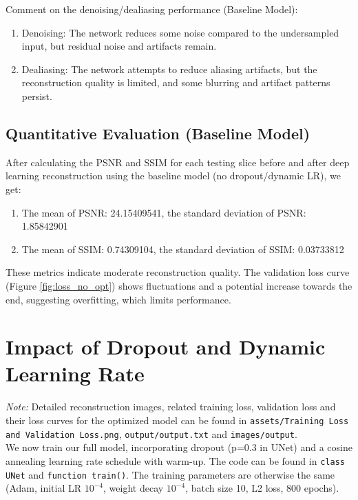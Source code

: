 \documentclass{article}
\begin{document}
Comment on the denoising/dealiasing performance (Baseline Model):
\begin{enumerate}
  \item Denoising: The network reduces some noise compared to the undersampled input, but residual noise and artifacts remain.
  \item Dealiasing: The network attempts to reduce aliasing artifacts, but the reconstruction quality is limited, and some blurring and artifact patterns persist.
\end{enumerate}

\subsection{Quantitative Evaluation (Baseline Model)}
After calculating the PSNR and SSIM for each testing slice before and after deep learning reconstruction using the baseline model (no dropout/dynamic LR), we get:
\begin{enumerate}
  \item The mean of PSNR: 24.15409541, the standard deviation of PSNR: 1.85842901
  \item The mean of SSIM: 0.74309104, the standard deviation of SSIM: 0.03733812
\end{enumerate}
These metrics indicate moderate reconstruction quality. The validation loss curve (Figure \ref{fig:loss_no_opt}) shows fluctuations and a potential increase towards the end, suggesting overfitting, which limits performance.



\section{Impact of Dropout and Dynamic Learning Rate}
\textit{Note: }Detailed reconstruction images, related training loss, validation loss and their
loss curves for the optimized model can be found in \texttt{assets/Training Loss and Validation Loss.png},
\texttt{output/output.txt} and \texttt{images/output}.\\
We now train our full model, incorporating dropout (p=0.3 in UNet) and a cosine annealing learning rate schedule with warm-up. The code can be found in \texttt{class UNet} and \texttt{function train()}. The training parameters are otherwise the same (Adam, initial LR $10^{-4}$, weight decay $10^{-4}$, batch size 10, L2 loss, 800 epochs).
\end{document}
